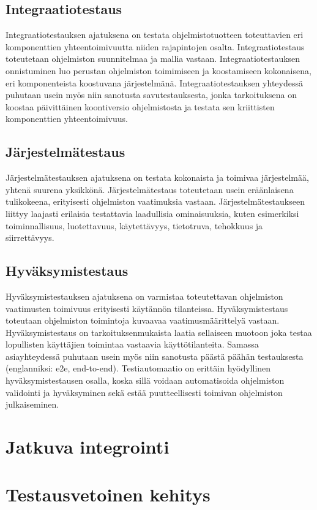  \subsection{Integraatiotestaus}

  Integraatiotestauksen ajatuksena on testata ohjelmistotuotteen toteuttavien eri komponenttien yhteentoimivuutta niiden rajapintojen osalta.
  Integraatiotestaus toteutetaan ohjelmiston suunnitelmaa ja mallia vastaan.
  Integraatiotestauksen onnistuminen luo perustan ohjelmiston toimimiseen ja koostamiseen kokonaisena, eri komponenteista koostuvana järjestelmänä.
  Integraatiotestauksen yhteydessä puhutaan usein myös niin sanotusta savutestauksesta, jonka tarkoituksena on koostaa päivittäinen koontiversio ohjelmistosta ja testata sen kriittisten komponenttien yhteentoimivuus.

  \subsection{Järjestelmätestaus}

  Järjestelmätestauksen ajatuksena on testata kokonaista ja toimivaa järjestelmää, yhtenä suurena yksikkönä.
  Järjestelmätestaus toteutetaan usein eräänlaisena tulikokeena, erityisesti ohjelmiston vaatimuksia vastaan.
  Järjestelmätestaukseen liittyy laajasti erilaisia testattavia laadullisia ominaisuuksia, kuten esimerkiksi toiminnallisuus, luotettavuus, käytettävyys, tietotruva, tehokkuus ja siirrettävyys.

  \subsection{Hyväksymistestaus}

  Hyväksymistestauksen ajatuksena on varmistaa toteutettavan ohjelmiston vaatimusten toimivuus erityisesti käytännön tilanteissa.
  Hyväksymistestaus toteutaan ohjelmiston toimintoja kuvaavaa vaatimusmäärittelyä vastaan.
  Hyväksymistestaus on tarkoituksenmukaista laatia sellaiseen muotoon joka testaa lopullisten käyttäjien toimintaa vastaavia käyttötilanteita.
  Samassa asiayhteydessä puhutaan usein myös niin sanotusta päästä päähän testauksesta (englanniksi: e2e, end-to-end).
  Testiautomaatio on erittäin hyödyllinen hyväksymistestausen osalla, koska sillä voidaan automatisoida ohjelmiston validointi ja hyväksyminen sekä estää puutteellisesti toimivan ohjelmiston julkaiseminen.

\section{Jatkuva integrointi}


\section{Testausvetoinen kehitys}

